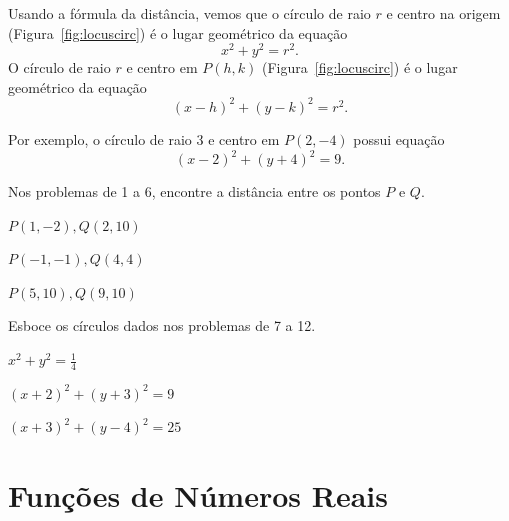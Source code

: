 Usando a fórmula da distância, vemos que o círculo de raio $r$ e centro na
origem (Figura~\ref{fig:locuscirc}) é o lugar geométrico da equação
\[
	x^2 + y^2 = r^2.
\]
O círculo de raio $r$ e centro em $P(h, k)$ (Figura~\ref{fig:locuscirc}) é
o lugar geométrico da equação
\[
	(x-h)^2 + (y-k)^2 = r^2.
\]


Por exemplo, o círculo de raio $3$ e centro em $P(2, -4)$ possui equação
\[
	(x-2)^2 + (y+4)^2 = 9.
\]

\begin{sectionproblems}


\noindent Nos problemas de 1 a 6, encontre a distância entre
          os pontos $P$ e $Q$.

%
        {$P(1, -2),  Q( 2, 10)$}

%
        {$P(-1, -1), Q( 4, 4)$}

%
        {$P(5, 10),  Q( 9, 10)$}

\noindent Esboce os círculos dados nos problemas de 7 a 12.

%
        {$x^2 + y^2 = \frac{1}{4}$}

%
        {$(x+2)^2 + (y+3)^2 = 9$}

%
        {$(x+3)^2 + (y-4)^2 = 25$}






\end{sectionproblems}

\section{Funções de Números Reais}
\label{sec:funcreal}

